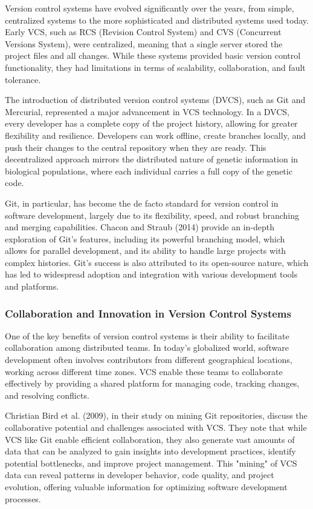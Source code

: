 \documentclass[12pt,twoside]{article}
\begin{document}
Version control systems have evolved significantly over the years, from simple, centralized systems to the more sophisticated and distributed systems used today. Early VCS, such as RCS (Revision Control System) and CVS (Concurrent Versions System), were centralized, meaning that a single server stored the project files and all changes. While these systems provided basic version control functionality, they had limitations in terms of scalability, collaboration, and fault tolerance.

The introduction of distributed version control systems (DVCS), such as Git and Mercurial, represented a major advancement in VCS technology. In a DVCS, every developer has a complete copy of the project history, allowing for greater flexibility and resilience. Developers can work offline, create branches locally, and push their changes to the central repository when they are ready. This decentralized approach mirrors the distributed nature of genetic information in biological populations, where each individual carries a full copy of the genetic code.

Git, in particular, has become the de facto standard for version control in software development, largely due to its flexibility, speed, and robust branching and merging capabilities. Chacon and Straub (2014) provide an in-depth exploration of Git's features, including its powerful branching model, which allows for parallel development, and its ability to handle large projects with complex histories. Git's success is also attributed to its open-source nature, which has led to widespread adoption and integration with various development tools and platforms.

\subsubsection{Collaboration and Innovation in Version Control Systems}

One of the key benefits of version control systems is their ability to facilitate collaboration among distributed teams. In today's globalized world, software development often involves contributors from different geographical locations, working across different time zones. VCS enable these teams to collaborate effectively by providing a shared platform for managing code, tracking changes, and resolving conflicts.

Christian Bird et al. (2009), in their study on mining Git repositories, discuss the collaborative potential and challenges associated with VCS. They note that while VCS like Git enable efficient collaboration, they also generate vast amounts of data that can be analyzed to gain insights into development practices, identify potential bottlenecks, and improve project management. This "mining" of VCS data can reveal patterns in developer behavior, code quality, and project evolution, offering valuable information for optimizing software development processes.
\end{document}
